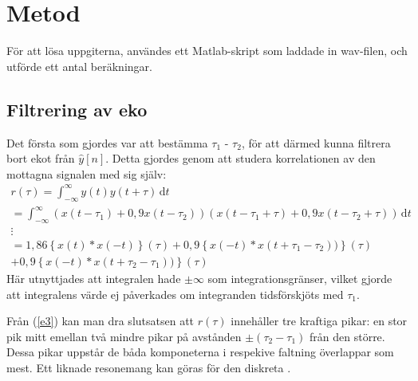 \documentclass[10pt,twocolumn]{article}
\begin{document}
\section{Metod}

För att lösa uppgiterna, användes ett Matlab-skript som laddade in wav-filen,
och utförde ett antal beräkningar.
\subsection{Filtrering av eko}

Det första som gjordes var att bestämma $\tau_1$ - $\tau_2$, för att därmed
kunna filtrera bort ekot från $\hat{y}[n]$. Detta gjordes genom att studera korrelationen
av den mottagna signalen med sig själv:
\begin{multline}
    r(\tau) = \int_{-\infty}^{\infty}\!y(t)y(t+\tau)\, \mathrm{d}t \\ 
    = \int_{-\infty}^{\infty}\!(x(t-\tau_1)+0,9 x(t-\tau_2))(x(t-\tau_1+\tau)+0,9 x(t-\tau_2+\tau))\, \mathrm{d}t \\
    \vdots \\
    = 1,86\left\{x(t) \ast x(-t)\right\}(\tau) + 
    0,9\left\{x(-t) \ast x(t+\tau_1-\tau_2))\right\}(\tau)\\ + 
    0,9\left\{x(-t) \ast x(t+\tau_2-\tau_1))\right\}(\tau)
    \label{e3}
\end{multline}
Här utnyttjades att integralen hade $\pm\infty$ som integrationsgränser, vilket gjorde att integralens värde ej
påverkades om integranden tidsförskjöts med $\tau_1$.

Från (\ref{e3}) kan man dra slutsatsen att $r(\tau)$ innehåller tre kraftiga pikar: en stor pik mitt emellan två mindre
pikar på avstånden $\pm(\tau_2 - \tau_1)$ från den större. Dessa pikar uppstår de båda komponeterna i respekive faltning
överlappar som mest. Ett liknade resonemang kan göras för den diskreta \yhat.
\end{document}
